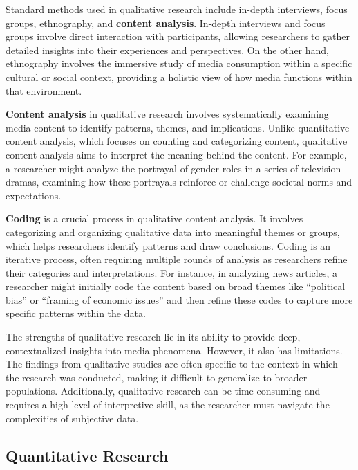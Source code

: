 \documentclass[
]{book}
\begin{document}
Standard methods used in qualitative research include in-depth interviews, focus groups, ethnography, and \textbf{content analysis}. In-depth interviews and focus groups involve direct interaction with participants, allowing researchers to gather detailed insights into their experiences and perspectives. On the other hand, ethnography involves the immersive study of media consumption within a specific cultural or social context, providing a holistic view of how media functions within that environment.

\textbf{Content analysis} in qualitative research involves systematically examining media content to identify patterns, themes, and implications. Unlike quantitative content analysis, which focuses on counting and categorizing content, qualitative content analysis aims to interpret the meaning behind the content. For example, a researcher might analyze the portrayal of gender roles in a series of television dramas, examining how these portrayals reinforce or challenge societal norms and expectations.

\textbf{Coding} is a crucial process in qualitative content analysis. It involves categorizing and organizing qualitative data into meaningful themes or groups, which helps researchers identify patterns and draw conclusions. Coding is an iterative process, often requiring multiple rounds of analysis as researchers refine their categories and interpretations. For instance, in analyzing news articles, a researcher might initially code the content based on broad themes like ``political bias'' or ``framing of economic issues'' and then refine these codes to capture more specific patterns within the data.

The strengths of qualitative research lie in its ability to provide deep, contextualized insights into media phenomena. However, it also has limitations. The findings from qualitative studies are often specific to the context in which the research was conducted, making it difficult to generalize to broader populations. Additionally, qualitative research can be time-consuming and requires a high level of interpretive skill, as the researcher must navigate the complexities of subjective data.

\subsection*{Quantitative Research}\label{quantitative-research}
\end{document}
